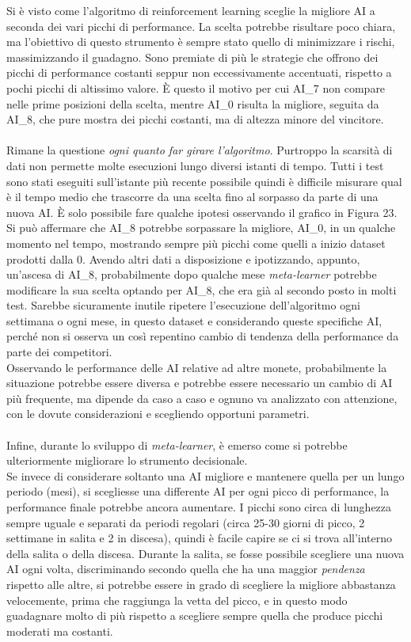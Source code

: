 \documentclass[a4paper,12pt]{report}
\begin{document}
\begin{fig}
Si è visto come l'algoritmo di reinforcement learning sceglie la migliore AI a seconda dei vari picchi di performance. La scelta potrebbe risultare poco chiara, ma l'obiettivo di questo strumento è sempre stato quello di minimizzare i rischi, massimizzando il guadagno. Sono premiate di più le strategie che offrono dei picchi di performance costanti seppur non eccessivamente accentuati, rispetto a pochi picchi di altissimo valore. È questo il motivo per cui AI\_7 non compare nelle prime posizioni della scelta, mentre AI\_0 risulta la migliore, seguita da AI\_8, che pure mostra dei picchi costanti, ma di altezza minore del vincitore.
\\~\\Rimane la questione \textit{ogni quanto far girare l'algoritmo}. Purtroppo la scarsità di dati non permette molte esecuzioni lungo diversi istanti di tempo. Tutti i test sono stati eseguiti sull'istante più recente possibile quindi è difficile misurare qual è il tempo medio che trascorre da una scelta fino al sorpasso da parte di una nuova AI. È solo possibile fare qualche ipotesi osservando il grafico in Figura 23.\\ Si può affermare che AI\_8 potrebbe sorpassare la migliore, AI\_0, in un qualche momento nel tempo, mostrando sempre più picchi come quelli a inizio dataset prodotti dalla 0. Avendo altri dati a disposizione e ipotizzando, appunto, un'ascesa di AI\_8, probabilmente dopo qualche mese \textit{meta-learner} potrebbe modificare la sua scelta optando per AI\_8, che era già al secondo posto in molti test. Sarebbe sicuramente inutile ripetere l'esecuzione dell'algoritmo ogni settimana o ogni mese, in questo dataset e considerando queste specifiche AI, perché non si osserva un così repentino cambio di tendenza della performance da parte dei competitori.\\Osservando le performance delle AI relative ad altre monete, probabilmente la situazione potrebbe essere diversa e potrebbe essere necessario un cambio di AI più frequente, ma dipende da caso a caso e ognuno va analizzato con attenzione, con le dovute considerazioni e scegliendo opportuni parametri.\\~\\ Infine, durante lo sviluppo di \textit{meta-learner}, è emerso come si potrebbe ulteriormente migliorare lo strumento decisionale.\\ Se invece di considerare soltanto una AI migliore e mantenere quella per un lungo periodo (mesi), si scegliesse una differente AI per ogni picco di performance, la performance finale potrebbe ancora aumentare. I picchi sono circa di lunghezza sempre uguale e separati da periodi regolari (circa 25-30 giorni di picco, 2 settimane in salita e 2 in discesa), quindi è facile capire se ci si trova all'interno della salita o della discesa. Durante la salita, se fosse possibile scegliere una nuova AI ogni volta, discriminando secondo quella che ha una maggior \textit{pendenza} rispetto alle altre, si potrebbe essere in grado di scegliere la migliore abbastanza velocemente, prima che raggiunga la vetta del picco, e in questo modo guadagnare molto di più rispetto a scegliere sempre quella che produce picchi moderati ma costanti.

\end{fig}
\end{document}
